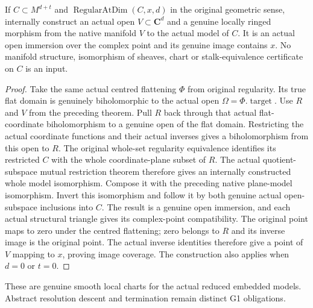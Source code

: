 \begin{theorem}
\label{hir:actual-analytic-subspace-regular-native-manifold-chart}
\leanok
If $C\subset M^{d+t}$ and $\operatorname{RegularAtDim}(C,x,d)$ in the
original geometric sense, internally construct an actual open
$V\subset\mathbf C^d$ and a genuine locally ringed morphism from the
native manifold $V$ to the actual model of $C$. It is an actual open
immersion over the complex point and its genuine image contains $x$.
No manifold structure, isomorphism of sheaves, chart or stalk-equivalence
certificate on $C$ is an input.
\end{theorem}
\begin{proof}
Take the same actual centred flattening $\Phi$ from original regularity.
Its true flat domain is genuinely biholomorphic to the actual open
$\Omega=\Phi.\operatorname{target}$. Use $R$ and $V$ from the preceding
theorem. Pull $R$ back through that actual flat-coordinate biholomorphism
to a genuine open of the flat domain. Restricting the actual coordinate
functions and their actual inverses gives a biholomorphism from this
open to $R$. The original whole-set regularity equivalence identifies
its restricted $C$ with the whole coordinate-plane subset of $R$.
The actual quotient-subspace mutual restriction theorem therefore gives
an internally constructed whole model isomorphism. Compose it with
the preceding native plane-model isomorphism. Invert this isomorphism
and follow it by both genuine actual open-subspace inclusions into $C$.
The result is a genuine open immersion, and each actual structural
triangle gives its complex-point compatibility. The original point
maps to zero under the centred flattening; zero belongs to $R$ and its
inverse image is the original point. The actual inverse identities
therefore give a point of $V$ mapping to $x$, proving image coverage.
The construction also applies when $d=0$ or $t=0$.
\end{proof}

These are genuine smooth local charts for the actual reduced embedded
models. Abstract resolution descent and termination remain distinct G1
obligations.
